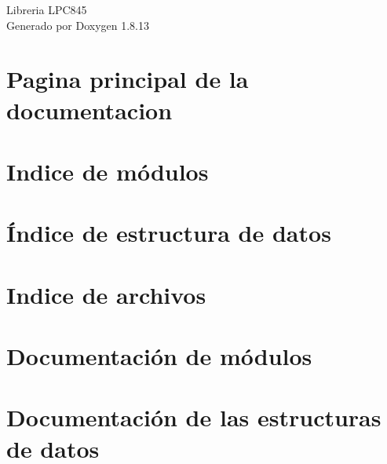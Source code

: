 \documentclass[twoside]{book}
\newcommand{\+}{\discretionary{\mbox{\scriptsize$\hookleftarrow$}}{}{}}
\newcommand{\clearemptydoublepage}{%
  \newpage{\pagestyle{empty}\cleardoublepage}%
}
\begin{document}
\hypersetup{pageanchor=false,
             bookmarksnumbered=true,
             pdfencoding=unicode
            }
\begin{titlepage}
\vspace*{7cm}
\begin{center}%
{\Large Libreria L\+P\+C845 }\\
\vspace*{1cm}
{\large Generado por Doxygen 1.8.13}\\
\end{center}
\end{titlepage}
\clearemptydoublepage
{}
\tableofcontents
\clearemptydoublepage
{}
\hypersetup{pageanchor=true}

\chapter{Pagina principal de la documentacion}
\label{index}\hypertarget{index}{}
\chapter{Indice de módulos}

\chapter{Índice de estructura de datos}

\chapter{Indice de archivos}

\chapter{Documentación de módulos}

\chapter{Documentación de las estructuras de datos}












\end{document}
